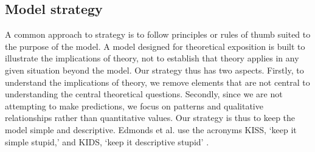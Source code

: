 \subsection{Model strategy}
A common approach to strategy is to follow principles or rules of thumb suited to the purpose of the model. %
A model designed for theoretical exposition  
is built to illustrate the implications of theory, not to establish that theory applies in any given situation beyond the model. Our strategy thus has two aspects. %
Firstly, to understand the implications of theory, we remove elements that are not central to understanding the central theoretical questions. Secondly, since we are not attempting to make predictions, 
we focus on patterns and qualitative relationships rather than quantitative values. Our strategy is thus to keep the model simple and descriptive. Edmonds et al. use the acronyms KISS, `keep it simple stupid,' and KIDS, `keep it descriptive stupid' \cite{edmondsDifferentModellingPurposes2019}.

